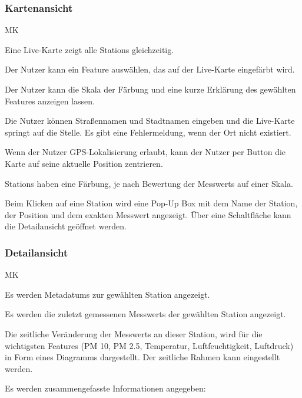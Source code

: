 \subsubsection*{\gls{Kartenansicht}}
\begin{Kriterien}{MK}

	\item Eine \gls{Live-Karte} zeigt alle \glspl{Station} gleichzeitig. 
	
	\item Der Nutzer kann ein \gls{Feature} auswählen, das auf der \gls{Live-Karte} eingefärbt wird.
	
	\item Der Nutzer kann die Skala der Färbung und eine kurze Erklärung des gewählten \gls{Feature}s anzeigen lassen.
	
	\item Die Nutzer können Straßennamen und Stadtnamen eingeben und die \gls{Live-Karte} springt auf die Stelle. 
		Es gibt eine Fehlermeldung, wenn der Ort nicht existiert.
	
	\item Wenn der Nutzer GPS-Lokalisierung erlaubt, kann der Nutzer per Button die Karte auf seine aktuelle Position zentrieren.

	\item \glspl{Station} haben eine Färbung, je nach Bewertung der \glspl{Messwert} auf einer Skala.
	
	\item Beim Klicken auf eine \gls{Station} wird eine \gls{Pop-Up} Box mit dem Name der Station, der Position und dem exakten \gls{Messwert} angezeigt.
		Über eine Schaltfläche kann die \gls{Detailansicht} geöffnet werden. 
\end{Kriterien}

\subsubsection*{\gls{Detailansicht}}
\begin{Kriterien}{MK}
	\item Es werden \glspl{Metadatum} zur gewählten \gls{Station} angezeigt.
	
	\item Es werden die zuletzt gemessenen \glspl{Messwert} der gewählten \gls{Station} angezeigt.

	\item Die zeitliche Veränderung der \glspl{Messwert} an dieser \gls{Station}, wird für die wichtigsten \glspl{Feature} (PM 10, 
	PM 2.5, Temperatur, Luftfeuchtigkeit, Luftdruck) in Form eines Diagramms dargestellt. Der zeitliche Rahmen kann eingestellt 
	werden.

	\item Es werden zusammengefasste Informationen angegeben: 
\end{Kriterien}
		
